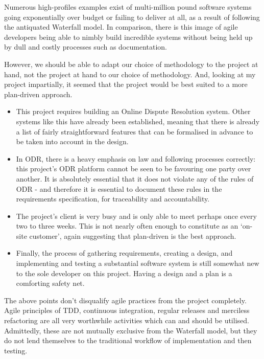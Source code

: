 Numerous high-profiles examples exist of multi-million pound software systems going exponentially over budget or failing to deliver at all, as a result of following the antiquated Waterfall model. In comparison, there is this image of agile developers being able to nimbly build incredible systems without being held up by dull and costly processes such as documentation.

However, we should be able to adapt our choice of methodology to the project at hand, not the project at hand to our choice of methodology. And, looking at my project impartially, it seemed that the project would be best suited to a more plan-driven approach.

\begin{itemize}

    \item This project requires building an Online Dispute Resolution system. Other systems like this have already been established, meaning that there is already a list of fairly straightforward features that can be formalised in advance to be taken into account in the design.
    
    \item In ODR, there is a heavy emphasis on law and following processes correctly: this project's ODR platform cannot be seen to be favouring one party over another. It is absolutely essential that it does not violate any of the rules of ODR - and therefore it is essential to document these rules in the requirements specification, for traceability and accountability.
    
    \item The project's client is very busy and is only able to meet perhaps once every two to three weeks. This is not nearly often enough to constitute as an `on-site customer', again suggesting that plan-driven is the best approach.
    
    \item Finally, the process of gathering requirements, creating a design, and implementing and testing a substantial software system is still somewhat new to the sole developer on this project. Having a design and a plan is a comforting safety net.

\end{itemize}

The above points don't disqualify agile practices from the project completely. Agile principles of TDD, continuous integration, regular releases and merciless refactoring are all very worthwhile activities which can and should be utilised. Admittedly, these are not mutually exclusive from the Waterfall model, but they do not lend themselves to the traditional workflow of implementation and then testing.

